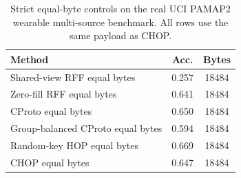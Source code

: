 \begin{table}[t]
\centering
\caption{Strict equal-byte controls on the real UCI PAMAP2 wearable multi-source benchmark. All rows use the same payload as CHOP.}
\label{tab:strict-equal-byte-pamap2}
\begin{tabular}{lcc}
\toprule
Method & Acc. & Bytes \\
\midrule
Shared-view RFF equal bytes & 0.257 & 18484 \\
Zero-fill RFF equal bytes & 0.641 & 18484 \\
CProto equal bytes & 0.650 & 18484 \\
Group-balanced CProto equal bytes & 0.594 & 18484 \\
Random-key HOP equal bytes & 0.669 & 18484 \\
CHOP equal bytes & 0.647 & 18484 \\
\bottomrule
\end{tabular}
\end{table}
